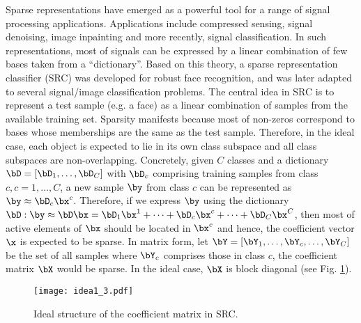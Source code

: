 \documentclass[letterpaper]{article}
\begin{document}
\label{sec:intro}
Sparse representations have emerged as a powerful tool for a range of signal processing applications. Applications include compressed sensing, signal denoising, image inpainting and more recently, signal classification. In such representations, most of signals can be expressed by a linear combination of few bases taken from a ``dictionary''. Based on this theory, a sparse representation classifier\cite{Wright2009SRC} (SRC) was developed for robust face recognition, and was later adapted to several signal/image classification problems\cite{Srinivas2014SHIRC,Mousavi2014ICIP,Srinivas2013,zhang2012multi,thongkamwitoon2015image}. The central idea in SRC is to represent a test sample (e.g. a face) as a linear combination of samples from the available training set. Sparsity manifests because most of non-zeros correspond to bases whose memberships are the same as the test sample. Therefore, in the ideal case, each object is expected to lie in its own class subspace and all class subspaces are non-overlapping.
Concretely, given $C$ classes and a dictionary $\bD = [\bD_1, \dots, \bD_C]$ with $\bD_c$ comprising training samples from class $c, c = 1, \dots, C$, a new sample $\by$ from class $c$ can be represented as $\by \approx \bD_c\bx^c$. Therefore, if we express $\by$ using the dictionary $\bD: \by \approx \bD\bx = \bD_1\bx^1 + \dots + \bD_c\bx^c + \dots + \bD_C\bx^C$, then most of active elements of $\bx$ should be located in $\bx^c$ and hence, the coefficient vector $\x$ is expected to be sparse. In matrix form, let $\bY = [\bY_1, \dots, \bY_c, \dots, \bY_C]$ be the set of all samples where $\bY_c$ comprises those in class $c$, the coefficient matrix $\bX$ would be sparse. In the ideal case, $\bX$ is block diagonal (see Fig. \ref{fig:srcidea}).%


\begin{figure}[t]
\centering
\texttt{[image: idea1\_3.pdf]}
\caption{\small Ideal structure of the coefficient matrix in SRC.}
\label{fig:srcidea}
\end{figure}
\end{document}
